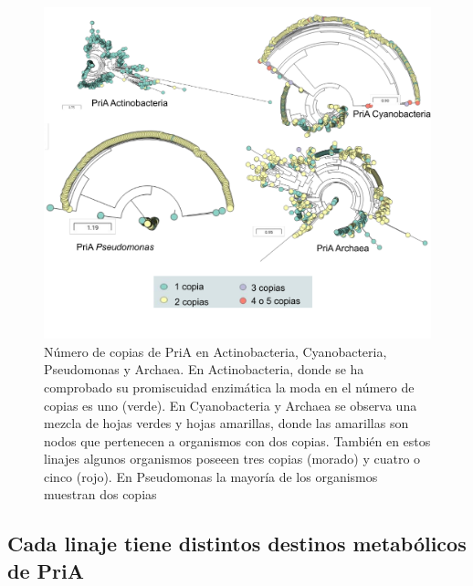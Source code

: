 \documentclass[12pt,twoside]{reedthesis}
\begin{document}
  \begin{figure}[h!tbp]
  \centering
  \includegraphics[angle = 0,scale = 0.8]{chapter4/PriAEvoMiningCopies.pdf}
  \caption[Copias extras de PriA en Actinobacteria, Cyanobacteria, {Pseudomonas} y Archaea]{\footnotesize{Número de copias de PriA en Actinobacteria, Cyanobacteria, {Pseudomonas} y Archaea. En Actinobacteria, donde se ha comprobado su promiscuidad enzimática la moda en el número de copias es uno (verde). En Cyanobacteria y Archaea se observa una mezcla de hojas verdes y hojas amarillas, donde las amarillas son nodos que pertenecen a organismos con dos copias. También en estos linajes algunos organismos poseeen tres copias (morado) y cuatro o cinco (rojo). En {Pseudomonas} la mayoría de los organismos muestran dos copias}}
  \label{fig:PriAEvoMiningCopies}
  \end{figure}
  
  \subsection{Cada linaje tiene distintos destinos metabólicos de
  PriA}\label{cada-linaje-tiene-distintos-destinos-metabolicos-de-pria}
  
\end{document}
